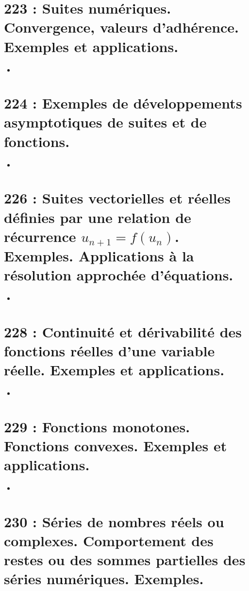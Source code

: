 \documentclass[a4paper,10pt,oneside,twocolumn,landscape]{book}
\begin{document}
\section{223 : Suites numériques. Convergence, valeurs d’adhérence. Exemples et applications.}

\begin{itemize}
\item 
\end{itemize}


\section{224 : Exemples de développements asymptotiques de suites et de fonctions.}

\begin{itemize}
	\item 
\end{itemize}

\section{226 : Suites vectorielles et réelles définies par une relation de récurrence $u_{n+1} = f(u_n)$. Exemples. Applications à la résolution approchée d’équations.}

\begin{itemize}
	\item 
\end{itemize}

\section{228 : Continuité et dérivabilité des fonctions réelles d’une variable réelle. Exemples et applications.}

\begin{itemize}
	\item 
\end{itemize}

\section{229 : Fonctions monotones. Fonctions convexes. Exemples et applications.}

\begin{itemize}
	\item 
\end{itemize}

\section{230 : Séries de nombres réels ou complexes. Comportement des restes ou des sommes partielles des séries numériques. Exemples.}
\end{document}
